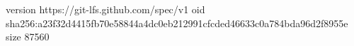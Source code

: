 version https://git-lfs.github.com/spec/v1
oid sha256:a23f32d4415fb70e58844a4dc0eb212991cfcded46633c0a784bda96d2f8955e
size 87560
